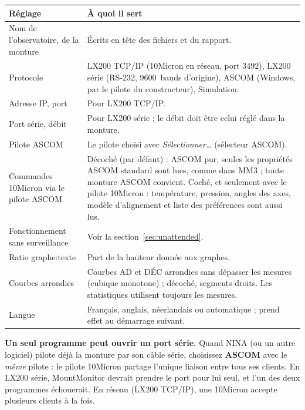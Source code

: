 
\begin{center}
\begin{tabularx}{\textwidth}{lX}
\toprule
\textbf{Réglage} & \textbf{À quoi il sert} \\
\midrule
Nom de l'observatoire, de la monture & Écrits en tête des fichiers et du
rapport. \\
Protocole & LX200 TCP/IP (10Micron en réseau, port 3492), LX200 série
(RS-232, 9600~bauds d'origine), ASCOM (Windows, par le pilote du
constructeur), Simulation. \\
Adresse IP, port & Pour LX200 TCP/IP. \\
Port série, débit & Pour LX200 série ; le débit doit être celui réglé dans la
monture. \\
Pilote ASCOM & Le pilote choisi avec \emph{Sélectionner\ldots} (sélecteur
ASCOM). \\
Commandes 10Micron via le pilote ASCOM & Décoché (par défaut) : ASCOM pur,
seules les propriétés ASCOM standard sont lues, comme dans MM3 ; toute monture
ASCOM convient. Coché, et seulement avec le pilote 10Micron : température,
pression, angles des axes, modèle d'alignement et liste des préférences sont
aussi lus. \\
Fonctionnement sans surveillance & Voir la section~\ref{sec:unattended}. \\
Ratio graphe:texte & Part de la hauteur donnée aux graphes. \\
Courbes arrondies & Courbes AD et DÉC arrondies sans dépasser les mesures
(cubique monotone) ; décoché, segments droits. Les statistiques utilisent
toujours les mesures. \\
Langue & Français, anglais, néerlandais ou automatique ; prend effet au
démarrage suivant. \\
\bottomrule
\end{tabularx}
\end{center}

\begin{warning}
\textbf{Un seul programme peut ouvrir un port série.} Quand NINA (ou un autre
logiciel) pilote déjà la monture par son câble série, choisissez
\textbf{ASCOM} avec le \emph{même} pilote : le pilote 10Micron partage l'unique
liaison entre tous ses clients. En LX200 série, MountMonitor devrait prendre le
port pour lui seul, et l'un des deux programmes échouerait. En réseau
(LX200 TCP/IP), une 10Micron accepte plusieurs clients à la fois.
\end{warning}

